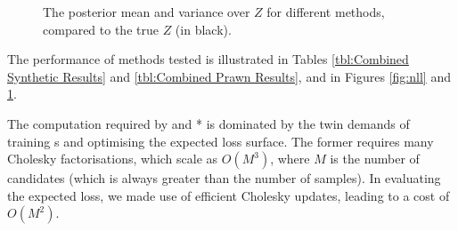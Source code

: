 \documentclass{article}
\begin{document}
% 
% 
% 
% 



\begin{figure}
	\centering
	\caption{The posterior mean and variance over $Z$ for different methods, compared to the true $Z$ (in black).}
\label{fig:logZ}
\end{figure}





The performance of methods tested is illustrated in Tables \ref{tbl:Combined Synthetic Results} and \ref{tbl:Combined Prawn Results}, and in Figures \ref{fig:nll} and \ref{fig:logZ}.

The computation required by  and * is dominated by the twin demands of training \gp s and optimising the expected loss surface. The former requires many Cholesky factorisations, which scale as $O(M^3)$, where $M$ is the number of candidates (which is always greater than the number of samples). In evaluating the expected loss, we made use of efficient Cholesky updates, leading to a cost of $O(M^2)$.
\end{document}
